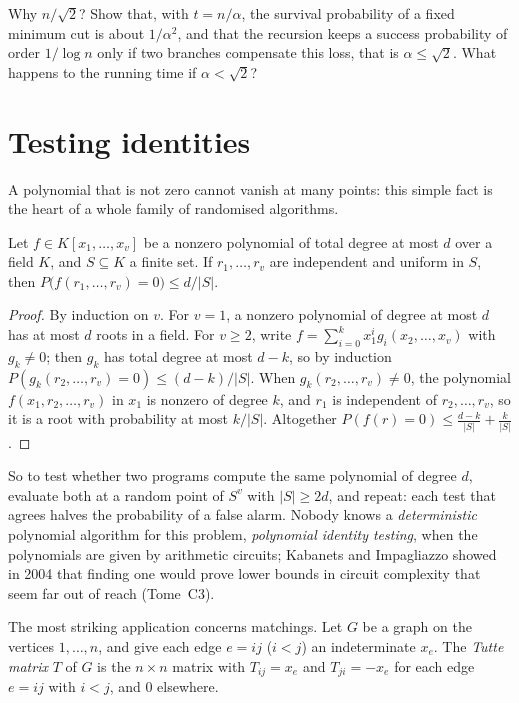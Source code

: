 \begin{think}
Why $n/\sqrt2$? Show that, with $t=n/\alpha$, the survival probability of a fixed minimum cut is about $1/\alpha^2$, and that the recursion keeps a success probability of order $1/\log n$ only if two branches compensate this loss, that is $\alpha\le\sqrt2$.
What happens to the running time if $\alpha<\sqrt2$?
\end{think}

\section{Testing identities}\label{sec:identities}

A polynomial that is not zero cannot vanish at many points: this simple fact is the heart of a whole family of randomised algorithms.

\begin{lemma}\label{lem:schwartzzippel}
Let $f\in K[x_1,\dots,x_v]$ be a nonzero polynomial of total degree at most $d$ over a field $K$, and $S\subseteq K$ a finite set. If $r_1,\dots,r_v$ are independent and uniform in $S$, then
$P\bigl(f(r_1,\dots,r_v)=0\bigr)\le d/|S|$.
\end{lemma}
\begin{proof}
By induction on $v$. For $v=1$, a nonzero polynomial of degree at most $d$ has at most $d$ roots in a field. For $v\ge2$, write $f=\sum_{i=0}^kx_1^ig_i(x_2,\dots,x_v)$ with $g_k\ne0$; then $g_k$ has total degree at most $d-k$, so by induction
$P(g_k(r_2,\dots,r_v)=0)\le(d-k)/|S|$. When $g_k(r_2,\dots,r_v)\ne0$, the polynomial $f(x_1,r_2,\dots,r_v)$ in $x_1$ is nonzero of degree $k$, and $r_1$ is independent of $r_2,\dots,r_v$, so it is a root with probability at most $k/|S|$. Altogether
$P(f(r)=0)\le\frac{d-k}{|S|}+\frac k{|S|}$.
\end{proof}

So to test whether two programs compute the same polynomial of degree $d$, evaluate both at a random point of $S^v$ with $|S|\ge2d$, and repeat: each test that agrees halves the probability of a false alarm. Nobody knows a
\emph{deterministic} polynomial algorithm for this problem, \emph{polynomial identity testing}, when the polynomials are given by arithmetic circuits; Kabanets and Impagliazzo showed in 2004 that finding one would prove lower bounds in circuit complexity that seem far out of reach (Tome~C3).

The most striking application concerns matchings. Let $G$ be a graph on the vertices $1,\dots,n$, and give each edge $e=ij$ ($i<j$) an indeterminate $x_e$. The \emph{Tutte matrix} $T$ of $G$ is the $n\times n$ matrix with
$T_{ij}=x_e$ and $T_{ji}=-x_e$ for each edge $e=ij$ with $i<j$, and $0$ elsewhere.

